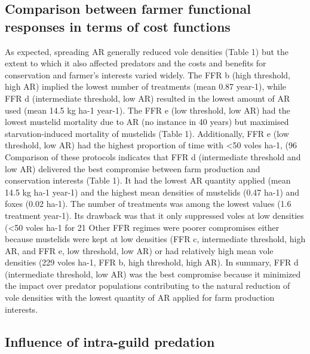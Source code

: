 \documentclass[11pt]{article}
\begin{document}
\subsection{Comparison between farmer functional responses in terms of cost functions}

As expected, spreading AR generally reduced vole densities (Table 1) but the extent to which it also affected predators and the costs and benefits for conservation and farmer’s interests varied widely. 
The FFR b (high threshold, high AR) implied the lowest number of treatments (mean 0.87 year-1), while FFR d (intermediate threshold, low AR) resulted in the lowest amount of AR used (mean 14.5 kg ha-1 year-1). The FFR e (low threshold, low AR) had the lowest mustelid mortality due to AR (no instance in 40 years) but maximised starvation-induced mortality of mustelids (Table 1). Additionally, FFR e (low threshold, low AR) had the highest proportion of time with <50 voles ha-1, (96 %
Comparison of these protocols indicates that FFR d (intermediate threshold and low AR) delivered the best compromise between farm production and conservation interests (Table 1). It had the lowest AR quantity applied (mean 14.5 kg ha-1 year-1) and the highest mean densities of mustelids (0.47 ha-1) and foxes (0.02 ha-1). The number of treatments was among the lowest values (1.6 treatment year-1). Its drawback was that it only suppressed voles at low densities (<50 voles ha-1 for 21%
Other FFR regimes were poorer compromises either because mustelids were kept at low densities (FFR  c, intermediate threshold, high AR, and FFR e, low threshold, low AR) or had relatively high mean vole densities (229 voles ha-1, FFR b, high threshold, high AR). In summary, FFR d (intermediate threshold, low AR) was the best compromise because it minimized the impact over predator populations contributing to the natural reduction of vole densities with the lowest quantity of AR applied for farm production interests.

\subsection{Influence of intra-guild predation}
\end{document}
